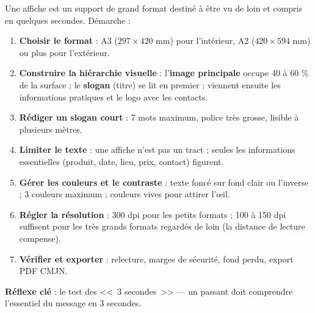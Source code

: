 \documentclass[11pt]{article}
\newcommand{\cle}[1]{{\popxbold\color{popdark}#1}}
\begin{document}
\begin{methode}
Une \cle{affiche} est un support de grand format destiné à être vu de loin et compris en quelques secondes. Démarche :
\begin{enumerate}
\item \textbf{Choisir le format} : A3 ($297 \times 420$ mm) pour l'intérieur, A2 ($420 \times 594$ mm) ou plus pour l'extérieur.
\item \textbf{Construire la hiérarchie visuelle} : l'\textbf{image principale} occupe 40 à 60 \% de la surface ; le \textbf{slogan} (titre) se lit en premier ; viennent ensuite les informations pratiques et le logo avec les contacts.
\item \textbf{Rédiger un slogan court} : 7 mots maximum, police très grosse, lisible à plusieurs mètres.
\item \textbf{Limiter le texte} : une affiche n'est pas un tract ; seules les informations essentielles (produit, date, lieu, prix, contact) figurent.
\item \textbf{Gérer les couleurs et le contraste} : texte foncé sur fond clair ou l'inverse ; 3 couleurs maximum ; couleurs vives pour attirer l'œil.
\item \textbf{Régler la résolution} : 300 dpi pour les petits formats ; 100 à 150 dpi suffisent pour les très grands formats regardés de loin (la distance de lecture compense).
\item \textbf{Vérifier et exporter} : relecture, marges de sécurité, fond perdu, export PDF CMJN.
\end{enumerate}
\textbf{Réflexe clé} : le test des <<~3 secondes~>> — un passant doit comprendre l'essentiel du message en 3 secondes.
\end{methode}
\end{document}

